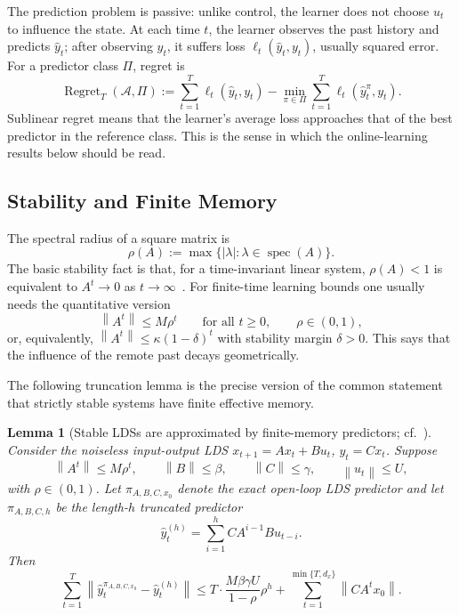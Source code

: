 \documentclass[11pt]{article}
\theoremstyle{plain}
\newtheorem{lemma}[theorem]{Lemma}
\theoremstyle{definition}
\theoremstyle{remark}
\newcommand{\norm}[1]{\left\lVert#1\right\rVert}
\newcommand{\abs}[1]{\left\lvert#1\right\rvert}
\newcommand{\spec}{\operatorname{spec}}
\begin{document}
The prediction problem is passive: unlike control, the learner does not choose $u_t$ to influence the state. At each time $t$, the learner observes the past history and predicts $\hat y_t$; after observing $y_t$, it suffers loss $\ell_t(\hat y_t,y_t)$, usually squared error. For a predictor class $\Pi$, regret is
\begin{equation}
    \operatorname{Regret}_T(\mathcal A,\Pi)
    :=
    \sum_{t=1}^{T} \ell_t(\hat y_t,y_t)
    -
    \min_{\pi \in \Pi}
    \sum_{t=1}^{T} \ell_t(\hat y_t^\pi,y_t).
    \label{eq:prediction-regret}
\end{equation}
Sublinear regret means that the learner's average loss approaches that of the best predictor in the reference class. This is the sense in which the online-learning results below should be read.

\subsection{Stability and Finite Memory}
\label{sec:stability-memory}

The spectral radius of a square matrix is
\[
    \rho(A) := \max\{\abs{\lambda}: \lambda \in \spec(A)\}.
\]
The basic stability fact is that, for a time-invariant linear system, $\rho(A)<1$ is equivalent to $A^t \to 0$ as $t \to \infty$~\citep[Fact~4.2]{hazan2025onlinecontrol}. For finite-time learning bounds one usually needs the quantitative version
\begin{equation}
    \norm{A^t} \le M \rho^t
    \qquad \text{for all } t \ge 0,
    \qquad \rho \in (0,1),
    \label{eq:quantitative-stability}
\end{equation}
or, equivalently, $\norm{A^t} \le \kappa(1-\delta)^t$ with stability margin $\delta>0$. This says that the influence of the remote past decays geometrically.

The following truncation lemma is the precise version of the common statement that strictly stable systems have finite effective memory.

\begin{lemma}[Stable LDSs are approximated by finite-memory predictors; cf.\ {\citet[Lemma~9.6]{hazan2025onlinecontrol}}]
\label{lem:stable-truncation}
Consider the noiseless input-output LDS $x_{t+1}=Ax_t+Bu_t$, $y_t=Cx_t$. Suppose
\[
    \norm{A^t} \le M\rho^t,\qquad
    \norm{B}\le \beta,\qquad
    \norm{C}\le \gamma,\qquad
    \norm{u_t}\le U,
\]
with $\rho \in (0,1)$. Let $\pi_{A,B,C,x_0}$ denote the exact open-loop LDS predictor and let $\pi_{A,B,C,h}$ be the length-$h$ truncated predictor
\[
    \hat y_t^{(h)}
    =
    \sum_{i=1}^{h} C A^{i-1}B u_{t-i}.
\]
Then
\begin{equation}
    \sum_{t=1}^{T}
    \norm{\hat y_t^{\pi_{A,B,C,x_0}}-\hat y_t^{(h)}}
    \le
    T \cdot \frac{M\beta\gamma U}{1-\rho}\rho^h
    +
    \sum_{t=1}^{\min\{T,d_x\}} \norm{CA^t x_0}.
    \label{eq:stable-truncation}
\end{equation}
\end{lemma}
\end{document}
